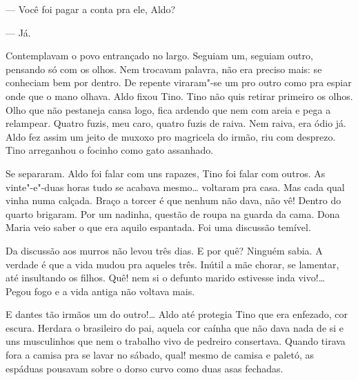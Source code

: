 --- Você foi pagar a conta pra ele, Aldo?

--- Já.

Contemplavam o povo entrançado no largo. Seguiam um, seguiam outro,
pensando só com os olhos. Nem trocavam palavra, não era preciso mais: se
conheciam bem por dentro. De repente viraram"-se um pro outro como pra
espiar onde que o mano olhava. Aldo fixou Tino. Tino não quis retirar
primeiro os olhos. Olho que não pestaneja cansa logo, fica ardendo que
nem com areia e pega a relampear. Quatro fuzis, meu caro, quatro fuzis
de raiva. Nem raiva, era ódio já. Aldo fez assim um jeito de muxoxo pro
magricela do irmão, riu com desprezo. Tino arreganhou o focinho como
gato assanhado. 

Se separaram. Aldo foi falar com uns rapazes, Tino foi falar com outros.
As vinte"-e"-duas horas tudo se acabava mesmo\ldots{} voltaram pra casa. Mas
cada qual vinha numa calçada. Braço a torcer é que nenhum não dava, não
vê! Dentro do quarto brigaram. Por um nadinha, questão de roupa na
guarda da cama. Dona Maria veio saber o que era aquilo espantada. Foi
uma discussão temível.

Da discussão aos murros não levou três dias. E por quê? Ninguém sabia. A
verdade é que a vida mudou pra aqueles três. Inútil a mãe chorar, se
lamentar, até insultando os filhos. Quê! nem si o defunto marido
estivesse inda vivo!\ldots{} Pegou fogo e a vida antiga não voltava mais.

E dantes tão irmãos um do outro!\ldots{} Aldo até protegia Tino que era
enfezado, cor escura. Herdara o brasileiro do pai, aquela cor caínha que
não dava nada de si e uns musculinhos que nem o trabalho vivo de
pedreiro consertava. Quando tirava fora a camisa pra se lavar no sábado,
qual! mesmo de camisa e paletó, as espáduas pousavam sobre o dorso curvo
como duas asas fechadas.



